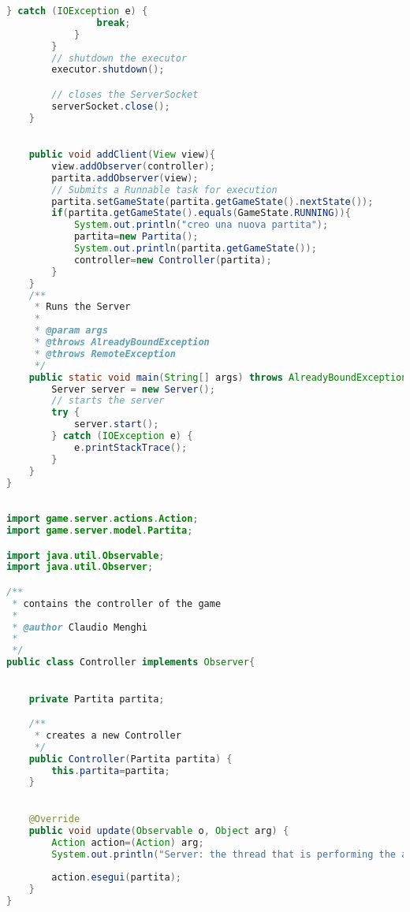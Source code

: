 \documentclass{article}
\begin{document}
\begin{lstlisting}[language=Java,escapechar=|]
			} catch (IOException e) {
				break;
			}
		}
		// shutdown the executor
		executor.shutdown();

		// closes the ServerSocket
		serverSocket.close();
	}
	

	public void addClient(View view){
		view.addObserver(controller);
		partita.addObserver(view);
		// Submits a Runnable task for execution
		partita.setGameState(partita.getGameState().nextState());
		if(partita.getGameState().equals(GameState.RUNNING)){
			System.out.println("creo una nuova partita");
			partita=new Partita();
			System.out.println(partita.getGameState());
			controller=new Controller(partita);
		}	
	}
	/**
	 * Runs the Server
	 * 
	 * @param args
	 * @throws AlreadyBoundException 
	 * @throws RemoteException 
	 */
	public static void main(String[] args) throws AlreadyBoundException, RemoteException {
		Server server = new Server();
		// starts the server
		try {
			server.start();
		} catch (IOException e) {
			e.printStackTrace();
		}
	}
}
\end{lstlisting}

\begin{lstlisting}[language=Java,escapechar=|]

import game.server.actions.Action;
import game.server.model.Partita;

import java.util.Observable;
import java.util.Observer;

/**
 * contains the controller of the game
 * 
 * @author Claudio Menghi
 * 
 */
public class Controller implements Observer{

	
	private Partita partita;

	/**
	 * creates a new Controller
	 */
	public Controller(Partita partita) {
		this.partita=partita;
	}

	
	@Override
	public void update(Observable o, Object arg) {
		Action action=(Action) arg;
		System.out.println("Server: the thread that is performing the action have been lanched ");
		
		action.esegui(partita);
	}
}
\end{lstlisting}

\clearpage







\nocite{*}
\end{document}
